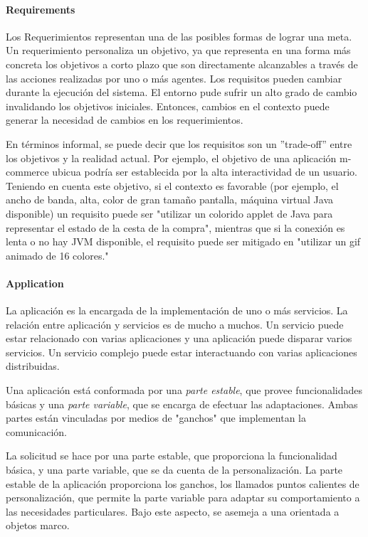 \paragraph{Requirements}

Los Requerimientos representan una de las posibles formas de lograr
una meta. Un requerimiento personaliza un objetivo, ya
que
representa en una forma más concreta los objetivos a corto plazo
que son directamente alcanzables a través de las acciones realizadas por uno o
más agentes. Los requisitos pueden cambiar
durante la ejecución del sistema. El entorno pude sufrir un alto grado de
cambio invalidando los objetivos iniciales. Entonces, cambios en el contexto
puede generar la necesidad de cambios en los requerimientos.

En términos informal, se puede decir que los
requisitos son un ''trade-off'' entre los 
objetivos y la realidad actual. Por ejemplo, el objetivo de una aplicación
m-commerce ubicua podría ser establecida por la alta interactividad de un
usuario. Teniendo en cuenta este
objetivo, si el contexto es favorable (por ejemplo, el ancho de banda, alta,
color de gran tamaño
pantalla, máquina virtual Java disponible) un requisito puede ser "utilizar un
colorido applet de Java para representar el estado de
la cesta de la compra", mientras que si la conexión es lenta o no hay JVM
disponible, el requisito puede ser
mitigado en "utilizar un gif animado de 16 colores."


\paragraph{Application}

La aplicación es la encargada de la implementación de uno o más servicios. La
relación entre aplicación y servicios es de mucho a muchos. Un servicio puede
estar relacionado con varias aplicaciones y una aplicación puede disparar
varios servicios. Un servicio complejo puede estar interactuando con varias
aplicaciones distribuidas. 

Una aplicación está conformada por una \textit{parte estable}, que provee
funcionalidades básicas y una \textit{parte variable}, que se encarga de
efectuar las adaptaciones. Ambas partes están vinculadas por medios de
"ganchos" que implementan la comunicación.



La solicitud se hace por una parte estable, que proporciona la funcionalidad
básica, y una parte variable, que se da cuenta de
la personalización. La parte estable de la aplicación proporciona los ganchos,
los llamados puntos calientes de personalización, que permite la
parte variable para adaptar su comportamiento a las necesidades particulares.
Bajo este aspecto, se asemeja a una orientada a objetos
marco.


